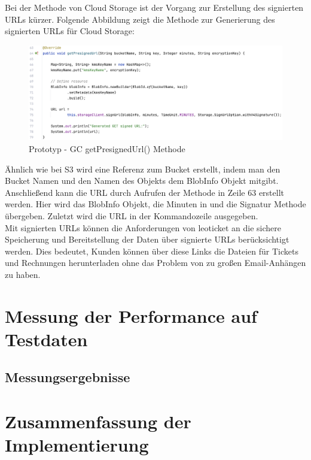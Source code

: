 \newpage

Bei der Methode von Cloud Storage ist der Vorgang zur Erstellung des signierten URLs kürzer. Folgende Abbildung zeigt die Methode zur Generierung des signierten URLs für Cloud Storage:

\begin{figure}[h]
	\centering
	\includegraphics[width=12cm,keepaspectratio]{Pictures/GCgetSignedUrl.png}
	\caption{Prototyp - GC getPresignedUrl() Methode} 
\end{figure}

Ähnlich wie bei S3 wird eine Referenz zum Bucket erstellt, indem man den Bucket Namen und den Namen des Objekts dem BlobInfo Objekt mitgibt. Anschließend kann die URL durch Aufrufen der Methode in Zeile 63 erstellt werden. Hier wird das BlobInfo Objekt, die Minuten in und die Signatur Methode übergeben. Zuletzt wird die URL in der Kommandozeile ausgegeben.\\

Mit signierten URLs können die Anforderungen von leoticket an die sichere Speicherung und Bereitstellung der Daten über signierte URLs berücksichtigt werden. Dies bedeutet, Kunden können über diese Links die Dateien für Tickets und Rechnungen herunterladen ohne das Problem von zu großen Email-Anhängen zu haben.



\newpage

\section{Messung der Performance auf Testdaten}

\subsection{Messungsergebnisse}

\section{Zusammenfassung der Implementierung}
